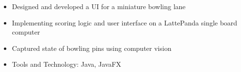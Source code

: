 \begin{itemize}
    \setlength\itemsep{0pt}
    \setlength{\parskip}{0pt}
    \item Designed and developed a UI for a miniature bowling lane
    \item Implementing scoring logic and user interface on a LattePanda single board computer
    \item Captured state of bowling pins using computer vision
    \item Tools and Technology: Java, JavaFX
\end{itemize}
